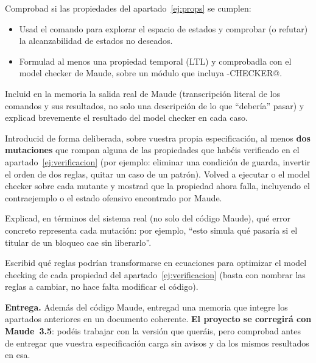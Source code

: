 \begin{listaejercicios}
\item\label{ej:verificacion}
Comprobad si las propiedades del apartado~\ref{ej:props} se cumplen:
\begin{itemize}
\item
Usad el comando \verb@search@ para explorar el espacio de estados y
comprobar (o refutar) la alcanzabilidad de estados no deseados.

\item
Formulad al menos una propiedad temporal (LTL) y comprobadla con el model
checker de Maude, sobre un m\'odulo que incluya \verb@MODEL-CHECKER@.
\end{itemize}
Incluid en la memoria la salida real de Maude (transcripci\'on literal de
los comandos y sus resultados, no solo una descripci\'on de lo que
``deber\'ia'' pasar) y explicad brevemente el resultado del model checker en
cada caso.

\item\label{ej:mutantes}
Introducid de forma deliberada, sobre vuestra propia especificaci\'on, al
menos \textbf{dos mutaciones} que rompan alguna de las propiedades que
hab\'eis verificado en el apartado~\ref{ej:verificacion} (por ejemplo:
eliminar una condici\'on de guarda, invertir el orden de dos reglas, quitar
un caso de un patr\'on). Volved a ejecutar \verb@search@ o el model checker
sobre cada mutante y mostrad que la propiedad ahora falla, incluyendo el
contraejemplo o el estado ofensivo encontrado por Maude.

Explicad, en t\'erminos del sistema real (no solo del c\'odigo Maude), qu\'e
error concreto representa cada mutaci\'on: por ejemplo, ``esto simula qu\'e
pasar\'ia si el titular de un bloqueo cae sin liberarlo''.

\item
Escribid qu\'e reglas podr\'ian transformarse en ecuaciones para optimizar
el model checking de cada propiedad del apartado~\ref{ej:verificacion} (basta
con nombrar las reglas a cambiar, no hace falta modificar el c\'odigo).

\end{listaejercicios}

\bigskip
\noindent\textbf{Entrega.} Adem\'as del c\'odigo Maude, entregad una memoria
que integre los apartados anteriores en un documento coherente.
\textbf{El proyecto se corregir\'a con Maude~3.5}: pod\'eis trabajar con la
versi\'on que quer\'ais, pero comprobad antes de entregar que vuestra
especificaci\'on carga sin avisos y da los mismos resultados en esa.

